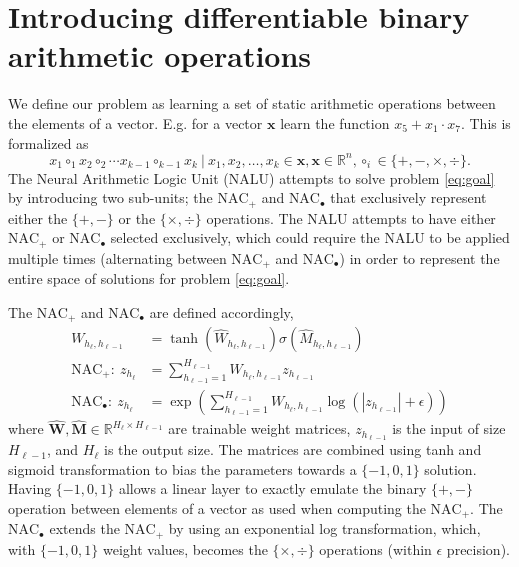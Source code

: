 \section{Introducing differentiable binary arithmetic operations}
\label{sec:Nalu}
We define our problem as learning a set of static arithmetic operations between the elements of a vector. E.g. for a vector $\mathbf{x}$ learn the function ${x_5 + x_1 \cdot x_7}$.
This is formalized as
\begin{equation}
x_1\circ_1 x_2 \circ_2 \cdots x_{k-1} \circ_{k-1} x_{k}\ |\ x_1, x_2, \dots, x_k \in \mathbf{x}, \mathbf{x} \in \mathbb{R}^n, \circ_i \in \{+, -, \times, \div \}.
\label{eq:goal}
\end{equation}
The Neural Arithmetic Logic Unit (NALU) \cite{trask-nalu} attempts to solve problem \ref{eq:goal} by introducing two sub-units; the $\text{NAC}_{+}$ and $\text{NAC}_{\bullet}$ that exclusively represent either the $\{+, -\}$ or the $\{\times, \div \}$ operations.
The NALU attempts to have either $\text{NAC}_{+}$ or $\text{NAC}_{\bullet}$ selected exclusively, which could require the NALU to be applied multiple times (alternating between $\text{NAC}_{+}$ and $\text{NAC}_{\bullet}$) in order to represent the entire space of solutions for problem \ref{eq:goal}.

The $\text{NAC}_{+}$ and $\text{NAC}_{\bullet}$ are defined accordingly,
\begin{align}
W_{h_\ell, h_{\ell-1}} &= \tanh(\hat{W}_{h_\ell, h_{\ell-1}}) \sigma(\hat{M}_{h_\ell, h_{\ell-1}}) \label{eq:weight}\\
\textrm{NAC}_+:\ z_{h_\ell} &= \sum_{h_{\ell-1}=1}^{H_{\ell-1}} W_{h_{\ell}, h_{\ell-1}} z_{h_{\ell-1}} \label{eq:naca}\\
\textrm{NAC}_\bullet:\ z_{h_\ell} &= \exp\left(\sum_{h_{\ell-1}=1}^{H_{\ell-1}} W_{h_{\ell}, h_{\ell-1}} \label{eq:nacm}\log(|z_{h_{\ell-1}}| + \epsilon) \right)
\end{align}
where $\hat{\mathbf{W}}, \hat{\mathbf{M}} \in \mathbb{R}^{H_{\ell} \times H_{\ell-1}}$ are trainable weight matrices, $z_{h_{\ell-1}}$ is the input of size $H_{\ell-1}$, and $H_{\ell}$ is the output size. The matrices are combined using tanh and sigmoid transformation to bias the parameters towards a $\{-1,0,1\}$ solution. Having $\{-1,0,1\}$ allows a linear layer to exactly emulate the binary $\{+, -\}$ operation between elements of a vector as used when computing the $\text{NAC}_{+}$.
The $\text{NAC}_{\bullet}$ extends the $\text{NAC}_{+}$ by using an exponential log transformation, which, with $\{-1,0,1\}$ weight values, becomes the $\{\times, \div \}$ operations (within $\epsilon$ precision).

